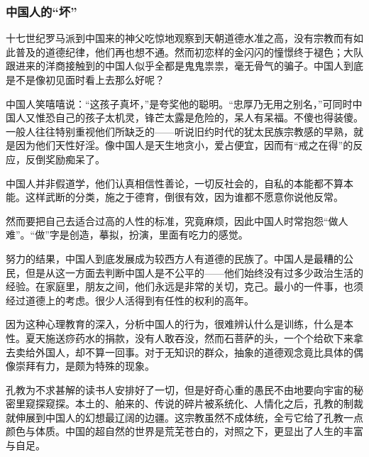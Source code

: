 \subsubsection*{中国人的“坏”}
\par 十七世纪罗马派到中国来的神父吃惊地观察到天朝道德水准之高，没有宗教而有如此普及的道德纪律，他们再也想不通。然而初恋样的金闪闪的憧憬终于褪色；大队跟进来的洋商接触到的中国人似乎全都是鬼鬼祟祟，毫无骨气的骗子。中国人到底是不是像初见面时看上去那么好呢？
\par 中国人笑嘻嘻说：“这孩子真坏，”是夸奖他的聪明。“忠厚乃无用之别名，”可同时中国人又惟恐自己的孩子太机灵，锋芒太露是危险的，呆人有呆福。不傻也得装傻。一般人往往特别重视他们所缺乏的——听说旧约时代的犹太民族宗教感的早熟，就是因为他们天性好淫。像中国人是天生地贪小，爱占便宜，因而有“戒之在得”的反应，反倒奖励痴呆了。
\par 中国人并非假道学，他们认真相信性善论，一切反社会的，自私的本能都不算本能。这样武断的分类，施之于德育，倒很有效，因为谁都不愿意你说他反常。
\par 然而要把自己去适合过高的人性的标准，究竟麻烦，因此中国人时常抱怨“做人难”。“做”字是创造，摹拟，扮演，里面有吃力的感觉。
\par 努力的结果，中国人到底发展成为较西方人有道德的民族了。中国人是最糟的公民，但是从这一方面去判断中国人是不公平的——他们始终没有过多少政治生活的经验。在家庭里，朋友之间，他们永远是非常的关切，克己。最小的一件事，也须经过道德上的考虑。很少人活得到有任性的权利的高年。
\par 因为这种心理教育的深入，分析中国人的行为，很难辨认什么是训练，什么是本性。夏天施送痧药水的捐款，没有人敢吞没，然而石菩萨的头，一个个给砍下来拿去卖给外国人，却不算一回事。对于无知识的群众，抽象的道德观念竟比具体的偶像崇拜有力，是颇为特殊的现象。
\par 孔教为不求甚解的读书人安排好了一切，但是好奇心重的愚民不由地要向宇宙的秘密里窥探窥探。本土的、舶来的、传说的碎片被系统化、人情化之后，孔教的制裁就伸展到中国人的幻想最辽阔的边疆。这宗教虽然不成体统，全亏它给了孔教一点颜色与体质。中国的超自然的世界是荒芜苍白的，对照之下，更显出了人生的丰富与自足。
